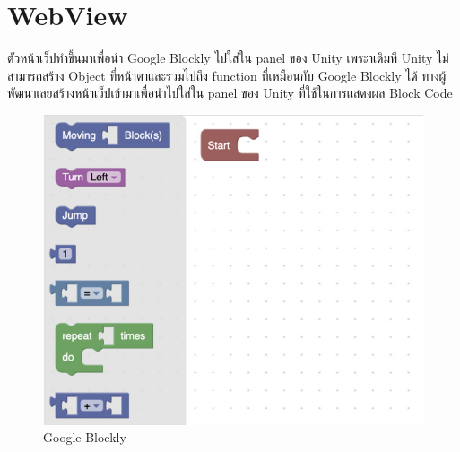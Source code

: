 \section{WebView}
ตัวหน้าเว็ปทำขึ้นมาเพื่อนำ Google Blockly ไปใส่ใน panel ของ Unity เพระาเดิมที Unity ไม่สามารถสร้าง Object ที่หน้าตาและรวมไปถึง function ที่เหมือนกับ Google Blockly ได้ ทางผู้พัฒนาเลยสร้างหน้าเว็ปเข้ามาเพื่อนำไปใส่ใน 
panel ของ Unity ที่ใช้ในการแสดงผล Block Code
\begin{figure}
\begin{center}
\includegraphics{pic/block1.jpg}
\end{center}
\caption[Poem]{Google Blockly}
\label{fig:walrus}
\end{figure}
